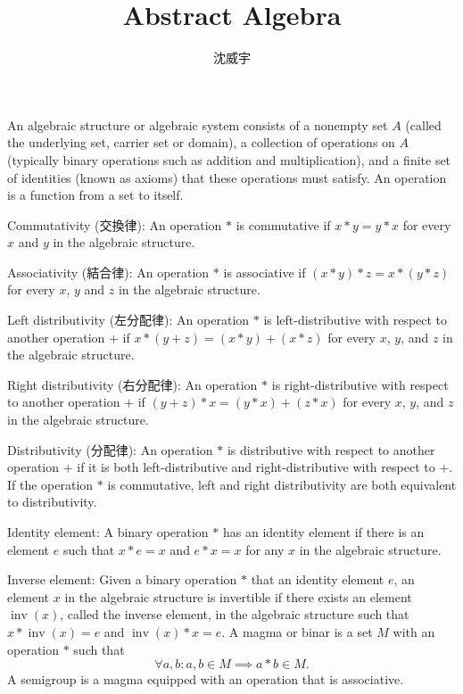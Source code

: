 \documentclass[a4paper,12pt]{article}
\begin{document}
\title{Abstract Algebra}
\author{沈威宇}
\date{\temtoday}
\titletocdoc
{}
An algebraic structure or algebraic system consists of a nonempty set $A$ (called the underlying set, carrier set or domain), a collection of operations on $A$ (typically binary operations such as addition and multiplication), and a finite set of identities (known as axioms) that these operations must satisfy.
An operation is a function from a set to itself.
\bit
\item Commutativity (交換律): An operation $*$ is commutative if $x*y=y*x$ for every $x$ and $y$ in the algebraic structure.
\item Associativity (結合律): An operation $*$ is associative if $(x*y)*z=x*(y*z)$ for every $x$, $y$ and $z$ in the algebraic structure.
\item Left distributivity (左分配律): An operation $*$ is left-distributive with respect to another operation $+$ if $x*(y+z)=(x*y)+(x*z)$ for every $x$, $y$, and $z$ in the algebraic structure.
\item Right distributivity (右分配律): An operation $*$ is right-distributive with respect to another operation $+$ if $(y+z)*x=(y*x)+(z*x)$ for every $x$, $y$, and $z$ in the algebraic structure.
\item Distributivity (分配律): An operation $*$ is distributive with respect to another operation $+$ if it is both left-distributive and right-distributive with respect to $+$. If the operation $*$ is commutative, left and right distributivity are both equivalent to distributivity.
\eit
{}
\bit
\item Identity element: A binary operation $*$ has an identity element if there is an element $e$ such that $x*e=x$ and $e*x=x$ for any $x$ in the algebraic structure.
\item Inverse element: Given a binary operation $*$ that an identity element $e$, an element $x$ in the algebraic structure is invertible if there exists an element $\operatorname{inv}(x)$, called the inverse element, in the algebraic structure such that $x*\operatorname{inv}(x)=e$ and $\operatorname{inv}(x)*x=e$.
\eit
{}
A magma or binar is a set $M$ with an operation $*$ such that
\[\forall a,b\colon a,b\in M\implies a*b\in M.\]
A semigroup is a magma equipped with an operation that is associative.
\end{document}

